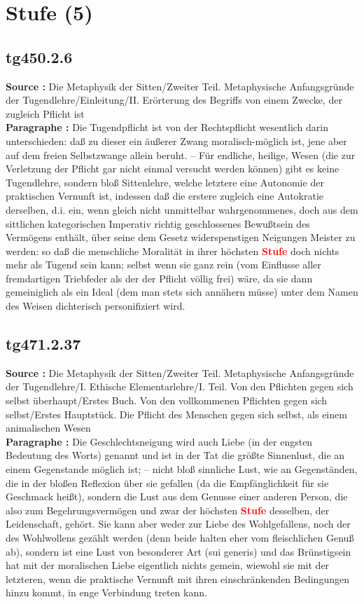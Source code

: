 \documentclass[a4paper,12pt,twoside]{book}
\newcommand{\match}[1]{\textcolor{red}{\textbf{#1}}}
\newcommand{\unnumberedsection}[1]{
	\section*{#1}
	\addcontentsline{toc}{section}{#1}
	\markright{#1}
}
\begin{document}
	\unnumberedsection{Stufe (5)} 
	\subsection*{tg450.2.6} 
	\textbf{Source : }Die Metaphysik der Sitten/Zweiter Teil. Metaphysische Anfangsgründe der Tugendlehre/Einleitung/II. Erörterung des Begriffs von einem Zwecke, der zugleich Pflicht ist\\  
	
	\textbf{Paragraphe : }Die Tugendpflicht ist von der Rechtspflicht wesentlich darin unterschieden: daß zu dieser ein äußerer Zwang moralisch-möglich ist, jene aber auf dem freien Selbstzwange allein beruht. – Für endliche, heilige, Wesen (die zur Verletzung der Pflicht gar nicht einmal versucht werden können) gibt es keine Tugendlehre, sondern bloß Sittenlehre, welche letztere eine Autonomie der praktischen Vernunft ist, indessen daß die erstere zugleich eine Autokratie derselben, d.i. ein, wenn gleich nicht unmittelbar wahrgenommenes, doch aus dem sittlichen kategorischen Imperativ richtig geschlossenes Bewußtsein des Vermögens enthält, über seine dem Gesetz widerspenstigen Neigungen Meister zu werden: so daß die menschliche Moralität in ihrer höchsten \match{Stufe} doch nichts mehr als Tugend sein kann; selbst wenn sie ganz rein (vom Einflusse aller fremdartigen Triebfeder als der der Pflicht völlig frei) wäre, da sie dann gemeiniglich als ein Ideal (dem man stets sich annähern müsse) unter dem Namen des Weisen dichterisch personifiziert wird. 
	
	\subsection*{tg471.2.37} 
	\textbf{Source : }Die Metaphysik der Sitten/Zweiter Teil. Metaphysische Anfangsgründe der Tugendlehre/I. Ethische Elementarlehre/I. Teil. Von den Pflichten gegen sich selbst überhaupt/Erstes Buch. Von den vollkommenen Pflichten gegen sich selbst/Erstes Hauptstück. Die Pflicht des Menschen gegen sich selbst, als einem animalischen Wesen\\  
	
	\textbf{Paragraphe : }Die Geschlechtsneigung wird auch Liebe (in der engsten Bedeutung des Worts) genannt und ist in der Tat die größte Sinnenlust, die an einem Gegenstande möglich ist; – nicht bloß sinnliche Lust, wie an Gegenständen, die in der bloßen Reflexion über sie gefallen (da die Empfänglichkeit für sie Geschmack heißt), sondern die Lust aus dem Genusse einer anderen Person, die also zum Begehrungsvermögen und zwar der höchsten \match{Stufe} desselben, der Leidenschaft, gehört. Sie kann aber weder zur Liebe des Wohlgefallens, noch der des Wohlwollens gezählt werden (denn beide halten eher vom fleischlichen Genuß ab), sondern ist eine Lust von besonderer Art (sui generis) und das Brünstigsein hat mit der moralischen Liebe eigentlich nichts gemein, wiewohl sie mit der letzteren, wenn die praktische Vernunft mit ihren einschränkenden Bedingungen hinzu kommt, in enge Verbindung treten kann. 
	
\end{document}
